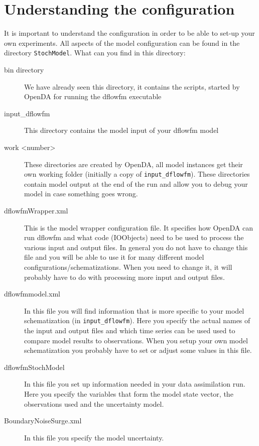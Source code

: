 \documentclass[a4paper,10pt]{article}
\newcommand{\driveloc}[1]{{\tt #1}}
\begin{document}
\section{Understanding the configuration}
It is important to understand the configuration in order to be able to set-up your own experiments. All aspects of the model configuration can be found in the directory  
\driveloc{StochModel}. What can you find in this directory:
\begin{description}
\item [bin directory] We have already seen this directory, it contains the scripts, started by OpenDA for running the dflowfm executable
\item [input\_dflowfm] This directory contains the model input of your dflowfm model
\item [work \textless number\textgreater] These directories are created by OpenDA, all model instances get their own working folder (initially a copy of \driveloc{input\_dflowfm}). These directories contain model output at the end of the run and allow you to debug your model in case something goes wrong.
\item [dflowfmWrapper.xml] This is the model wrapper configuration file. It specifies how OpenDA can run dflowfm and what code (IOObjects) need to be used to process the various input and output files. In general you do not have to change this file and you will be able to use it for many different model configurations/schematizations. When you need to change it, it will probably have to do with processing more input and output files.
\item [dflowfmmodel.xml] In this file you will find information that is more specific to your model schematization (in \driveloc{input\_dflowfm}). Here you specify the actual names of the input and output files and which time series can be used used to compare model results to observations. When you setup your own model schematization you probably have to set or adjust some values in this file.
\item [dflowfmStochModel] In this file you set up information needed in your data assimilation run. Here you specify the variables that form the model state vector, the observations used and the uncertainty model.
\item [BoundaryNoiseSurge.xml] In this file you specify the model uncertainty.
\end{description}
\end{document}
